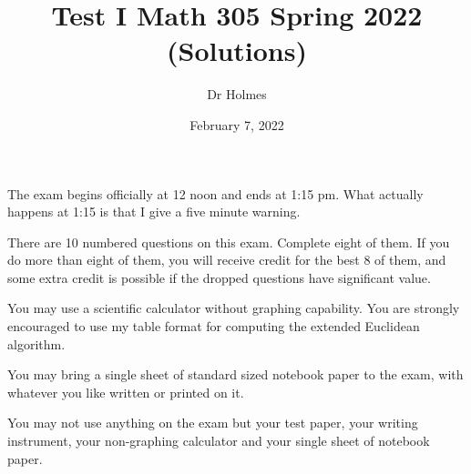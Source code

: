 \documentclass[12pt]{article}
\title{Test I Math 305 Spring 2022 (Solutions)}
\author{Dr Holmes}
\date{February 7, 2022}
\begin{document}
\maketitle

The exam begins officially at 12 noon and ends at 1:15 pm.  What actually happens at 1:15 is that I give a five minute warning.

There are 10 numbered questions on this exam.  Complete eight of them.  If you do more than eight of them, you will receive credit for the best 8 of them, and some extra credit is possible if the dropped questions have significant value.

You may use a scientific calculator without graphing capability.  You are strongly encouraged to use my table format for computing the extended Euclidean algorithm.

You may bring a single sheet of standard sized notebook paper to the exam, with whatever you like written or printed on it.

You may not use anything on the exam but your test paper, your writing instrument, your non-graphing calculator and your single sheet of notebook paper.

\newpage
\end{document}
